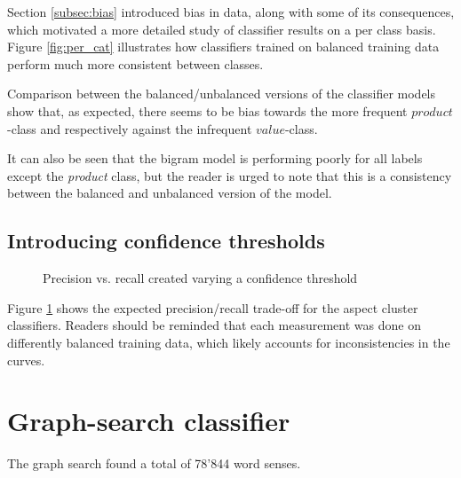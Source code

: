 \documentclass[a4paper,11pt]{kth-mag}
\begin{document}
Section \ref{subsec:bias} introduced bias in data, along with some of its consequences, which motivated a more detailed study of classifier results on a per class basis. Figure \ref{fig:per_cat} illustrates how classifiers trained on balanced training data perform much more consistent between classes.

Comparison between the balanced/unbalanced versions of the classifier models show that, as expected, there seems to be bias towards the more frequent $product$-class and respectively against the infrequent $value$-class.

It can also be seen that the bigram model is performing poorly for all labels except the \emph{product} class, but the reader is urged to note that this is a consistency between the balanced and unbalanced version of the model.

\newpage

\subsection{Introducing confidence thresholds}
\begin{figure}[h]
  \centering
  \caption{Precision vs. recall created varying a confidence threshold}
  \label{fig:pr_curve}
\end{figure}


Figure \ref{fig:pr_curve} shows the expected precision/recall trade-off for the aspect cluster classifiers. Readers should be reminded that each measurement was done on differently balanced training data, which likely accounts for inconsistencies in the curves.

\newpage

\section{Graph-search classifier}
The graph search found a total of 78'844 word senses.
\end{document}
